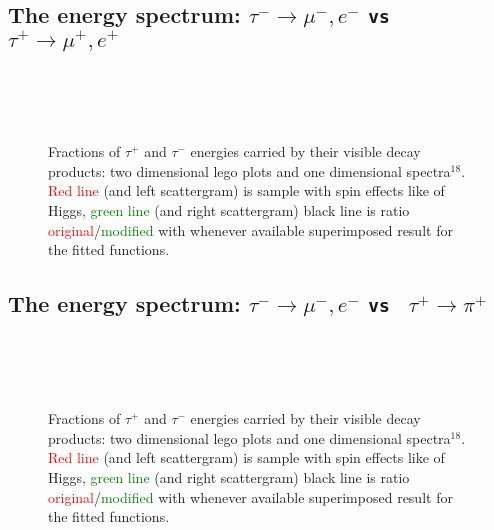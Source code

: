 {\small {} }


\newpage


\subsection{The energy spectrum: $\tau^- \to \mu^-, e^-$ {\tt vs } $\tau^+ \to \mu^+, e^+$}
\vspace{1\baselineskip}

\begin{figure}[h!]
\centering
{}
 \\
 \\
 \\
\caption{\small Fractions of  $\tau^+$ and $\tau^-$ energies carried by their visible  decay products:
two dimensional lego plots and one dimensional spectra$^{18}$.
\textcolor{red}{Red line} (and left scattergram) is sample with spin effects like of Higgs,
\textcolor{green}{green line} (and right scattergram) \greenlineis
black line is ratio \textcolor{red}{original}/\textcolor{green}{modified} with whenever available superimposed result for the
fitted functions.
}
\end{figure}

\newpage
\subsection{The energy spectrum: $\tau^- \to \mu^-, e^-$ {\tt vs } $\tau^+ \to \pi^+$}
\vspace{1\baselineskip}

\begin{figure}[h!]
\centering
{}
 \\
 \\
 \\
\caption{\small Fractions of  $\tau^+$ and $\tau^-$ energies carried by their visible  decay products:
two dimensional lego plots and one dimensional spectra$^{18}$.
\textcolor{red}{Red line} (and left scattergram) is sample with spin effects like of Higgs,
\textcolor{green}{green line} (and right scattergram) \greenlineis
black line is ratio \textcolor{red}{original}/\textcolor{green}{modified} with whenever available superimposed result for the
fitted functions.
}
\end{figure}


